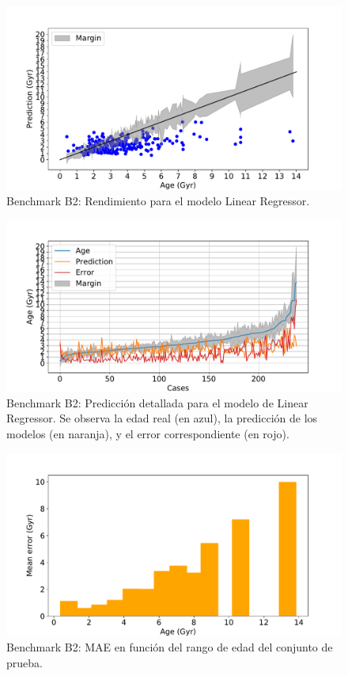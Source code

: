\begin{figure}[H]
\begin{center}
 \includegraphics[width=0.8\linewidth]{Figuras/Experimentos/B_B2_lr_1.pdf}
\end{center}
\caption{Benchmark B2: Rendimiento para el modelo Linear Regressor.}
 \label{fig:benchB2_details_lr_1}
\end{figure}

\begin{figure}[H]
\begin{center}
 \includegraphics[width=0.8\linewidth]{Figuras/Experimentos/B_B2_lr_2.pdf}
\end{center}
\caption{Benchmark B2: Predicción detallada para el modelo de Linear Regressor. Se observa la edad real (en azul), la predicción de los modelos (en naranja), y el error correspondiente (en rojo).}
 \label{fig:benchB2_details_lr_2}
\end{figure}

\begin{figure}[H]
\begin{center}
 \includegraphics[width=0.8\linewidth]{Figuras/Experimentos/B_B2_lr_3.pdf}
\end{center}
\caption{Benchmark B2: MAE en función del rango de edad del conjunto de prueba.}
 \label{fig:benchB2_details_lr_3}
\end{figure}

